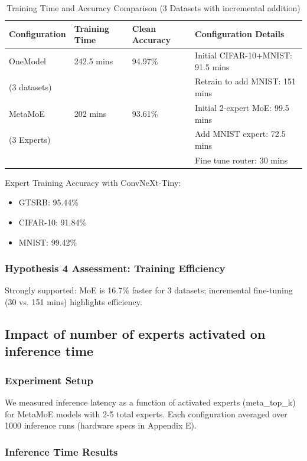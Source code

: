 \documentclass[11pt,a4paper]{article}
\begin{document}
\begin{table}[H]
\centering
\begin{tabular}{llll}
\toprule
\textbf{Configuration} & \textbf{Training Time} & \textbf{Clean Accuracy} & \textbf{Configuration Details} \\
\midrule
OneModel & 242.5 mins & 94.97\% & Initial CIFAR-10+MNIST: 91.5 mins \\
(3 datasets) & & & Retrain to add MNIST: 151 mins \\
MetaMoE & 202 mins & 93.61\% & Initial 2-expert MoE: 99.5 mins \\
(3 Experts) & & & Add MNIST expert: 72.5 mins \\
 & & & Fine tune router: 30 mins \\
\bottomrule
\end{tabular}
\caption{Training Time and Accuracy Comparison (3 Datasets with incremental addition)}
\end{table}

Expert Training Accuracy with ConvNeXt-Tiny:
\begin{itemize}
    \item GTSRB: 95.44\%
    \item CIFAR-10: 91.84\%
    \item MNIST: 99.42\%
\end{itemize}

\subsubsection{Hypothesis 4 Assessment: Training Efficiency}

Strongly supported: MoE is 16.7\% faster for 3 datasets; incremental fine-tuning (30 vs. 151 mins) highlights efficiency.

\subsection{Impact of number of experts activated on inference time}

\subsubsection{Experiment Setup}

We measured inference latency as a function of activated experts (meta\_top\_k) for MetaMoE models with 2-5 total experts. Each configuration averaged over 1000 inference runs (hardware specs in Appendix E).

\subsubsection{Inference Time Results}
\end{document}
